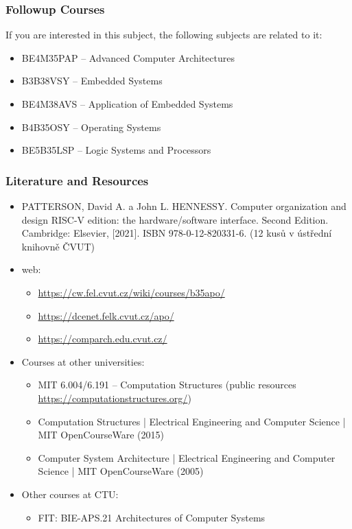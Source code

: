 \documentclass{beamer}
\begin{document}
\begin{frame}
\frametitle{Followup Courses}
If you are interested in this subject, the following subjects are related to it:
\begin{itemize}
\item BE4M35PAP -- Advanced Computer Architectures
\item B3B38VSY  -- Embedded Systems
\item BE4M38AVS -- Application of Embedded Systems
\item B4B35OSY -- Operating Systems
\item BE5B35LSP -- Logic Systems and Processors
\end{itemize}
\end{frame}


\begin{frame}
\frametitle{Literature and Resources}
\begin{itemize}
\item PATTERSON, David A. a John L. HENNESSY. Computer organization and design RISC-V edition:
    the hardware/software interface. Second Edition. Cambridge: Elsevier, [2021].
    ISBN 978-0-12-820331-6. (12 kusů v ústřední knihovně ČVUT)
\item web:
\begin{itemize}
\item \url{https://cw.fel.cvut.cz/wiki/courses/b35apo/}
\item \url{https://dcenet.felk.cvut.cz/apo/}
\item \url{https://comparch.edu.cvut.cz/}
\end{itemize}
\item Courses at other universities:
\begin{itemize}
\item MIT 6.004/6.191 – Computation Structures (public resources \url{https://computationstructures.org/})
\item Computation Structures | Electrical Engineering and Computer Science | MIT OpenCourseWare (2015)
\item Computer System Architecture | Electrical Engineering and Computer Science | MIT OpenCourseWare (2005)
\end{itemize}
\item Other courses at CTU:
\begin{itemize}
\item FIT: BIE-APS.21 Architectures of Computer Systems
\end{itemize}

\end{itemize}
\end{frame}
\end{document}
